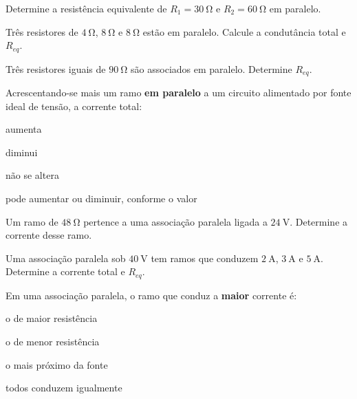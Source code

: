 \blocofixacao
\begin{questao}[1]{}

Determine a resistência equivalente de $R_1=\SI{30}{\ohm}$ e
$R_2=\SI{60}{\ohm}$ em paralelo.


\end{questao}
\begin{questao}[1]{}

Três resistores de $\SI{4}{\ohm}$, $\SI{8}{\ohm}$ e $\SI{8}{\ohm}$ estão em
paralelo. Calcule a condutância total e $R_{eq}$.


\end{questao}
\begin{questao}[1]{}

Três resistores iguais de $\SI{90}{\ohm}$ são associados em paralelo. Determine
$R_{eq}$.


\end{questao}
\begin{questao}[1]{}

Acrescentando-se mais um ramo \textbf{em paralelo} a um circuito alimentado por
fonte ideal de tensão, a corrente total:
\begin{alternativas}[2]
\item aumenta
\item diminui
\item não se altera
\item pode aumentar ou diminuir, conforme o valor
\end{alternativas}


\end{questao}
\begin{questao}[1]{}

Um ramo de $\SI{48}{\ohm}$ pertence a uma associação paralela ligada a
$\SI{24}{\volt}$. Determine a corrente desse ramo.


\end{questao}
\begin{questao}[1]{}

Uma associação paralela sob $\SI{40}{\volt}$ tem ramos que conduzem
$\SI{2}{\ampere}$, $\SI{3}{\ampere}$ e $\SI{5}{\ampere}$. Determine a corrente
total e $R_{eq}$.


\end{questao}
\begin{questao}[1]{}

Em uma associação paralela, o ramo que conduz a \textbf{maior} corrente é:
\begin{alternativas}[2]
\item o de maior resistência
\item o de menor resistência
\item o mais próximo da fonte
\item todos conduzem igualmente
\end{alternativas}


\end{questao}

